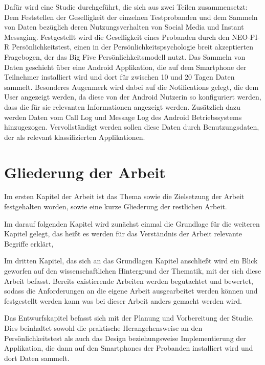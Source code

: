 Dafür wird eine Studie durchgeführt, die sich aus zwei Teilen zusammensetzt:
Dem Feststellen der Geselligkeit der einzelnen Testprobanden und dem Sammeln von Daten bezüglich deren Nutzungsverhalten von Social Media und Instant Messaging. 
Festgestellt wird die Geselligkeit eines Probanden durch den NEO-PI-R Persönlichkeitstest, einen in der Persönlichkeitspsychologie breit akzeptierten Fragebogen, der das Big Five Persönlichkeitsmodell nutzt.
Das Sammeln von Daten geschieht über eine Android Applikation, die auf dem Smartphone der Teilnehmer installiert wird und dort für zwischen 10 und 20 Tagen Daten sammelt.
Besonderes Augenmerk wird dabei auf die Notifications gelegt, die dem User angezeigt werden, da diese von der Android Nutzerin so konfiguriert werden, dass die für sie relevanten Informationen angezeigt werden.
Zusätzlich dazu werden Daten vom Call Log und Message Log des Android Betriebssystems hinzugezogen.
Vervollständigt werden sollen diese Daten durch Benutzungsdaten, der als relevant klassifizierten Applikationen.


\section{Gliederung der Arbeit}
\label{ch:Einleitung:sec:Gliederung}

Im ersten Kapitel der Arbeit ist das Thema sowie die Zielsetzung der Arbeit festgehalten worden, sowie eine kurze Gliederung der restlichen Arbeit.
\par

Im darauf folgenden Kapitel wird zunächst einmal die Grundlage für die weiteren Kapitel gelegt, das heißt
es werden für das Verständnis der Arbeit relevante Begriffe erklärt, 
\par


Im dritten Kapitel, das sich an das Grundlagen Kapitel anschließt wird ein Blick geworfen auf den wissenschaftlichen Hintergrund der Thematik,
 mit der sich diese Arbeit befasst.
Bereits existierende Arbeiten werden begutachtet und bewertet, sodass die Anforderungen an die eigene Arbeit ausgearbeitet werden können und festgestellt werden kann was bei dieser Arbeit anders gemacht werden wird.
\par

Das Entwurfskapitel befasst sich mit der Planung und Vorbereitung der Studie.
Dies beinhaltet sowohl die praktische Herangehensweise an den Persönlichkeitstest als auch das Design beziehungsweise Implementierung der Applikation,
die dann auf den Smartphones der Probanden installiert wird und dort Daten sammelt. 

